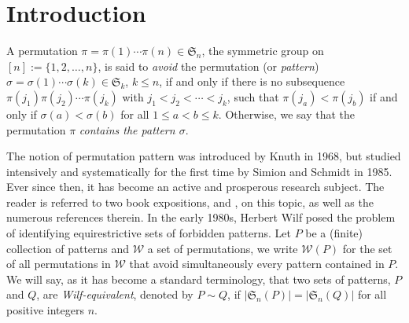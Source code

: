 \documentclass[12pt]{amsart}
\numberwithin{equation}{section}
\theoremstyle{plain}
\theoremstyle{definition}
\def\S{\mathfrak{S}}
\begin{document}


\maketitle



\section{Introduction}\label{sec1: intro}

A permutation $\pi=\pi(1)\cdots\pi(n)\in\S_n$, the symmetric group on $[n]:=\{1,2,\ldots,n\}$, is said to {\em avoid} the permutation (or {\em pattern}) $\sigma=\sigma(1)\cdots \sigma(k)\in\S_k$, $k\le n$, if and only if there is no subsequence $\pi(j_1)\pi(j_2)\cdots\pi(j_k)$ with $j_1<j_2<\cdots<j_k$, such that $\pi(j_a)<\pi(j_b)$ if and only if $\sigma(a)<\sigma(b)$ for all $1\le a<b\le k$. Otherwise, we say that the permutation $\pi$ {\em contains the pattern $\sigma$}. 

The notion of permutation pattern was introduced by Knuth \cite[pp.~242-243]{knu} in 1968, but studied intensively and systematically for the first time by Simion and Schmidt \cite{SS} in 1985. Ever since then, it has become an active and prosperous research subject. The reader is referred to two book expositions, \cite[Chapters 4 and 5]{bon} and \cite{kit}, on this topic, as well as the numerous references therein. In the early 1980s, Herbert Wilf posed the problem of identifying equirestrictive sets of forbidden patterns. Let $P$ be a (finite) collection of patterns and $\mathcal{W}$ a set of permutations, we write $\mathcal{W}(P)$ for the set of all permutations in $\mathcal{W}$ that avoid simultaneously every pattern contained in $P$. We will say, as it has become a standard terminology, that two sets of patterns, $P$ and $Q$, are {\em Wilf-equivalent}, denoted by $P\sim Q$, if $|\S_n(P)|=|\S_n(Q)|$ for all positive integers $n$. 

\end{document}
